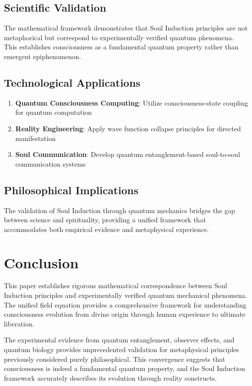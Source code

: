 \documentclass[12pt,a4paper]{article}
\begin{document}
\subsection{Scientific Validation}
The mathematical framework demonstrates that Soul Induction principles are not metaphorical but correspond to experimentally verified quantum phenomena. This establishes consciousness as a fundamental quantum property rather than emergent epiphenomenon.

\subsection{Technological Applications}
\begin{enumerate}
\item \textbf{Quantum Consciousness Computing}: Utilize consciousness-state coupling for quantum computation
\item \textbf{Reality Engineering}: Apply wave function collapse principles for directed manifestation
\item \textbf{Soul Communication}: Develop quantum entanglement-based soul-to-soul communication systems
\end{enumerate}

\subsection{Philosophical Implications}
The validation of Soul Induction through quantum mechanics bridges the gap between science and spirituality, providing a unified framework that accommodates both empirical evidence and metaphysical experience.

\section{Conclusion}
This paper establishes rigorous mathematical correspondence between Soul Induction principles and experimentally verified quantum mechanical phenomena. The unified field equation provides a comprehensive framework for understanding consciousness evolution from divine origin through human experience to ultimate liberation.

The experimental evidence from quantum entanglement, observer effects, and quantum biology provides unprecedented validation for metaphysical principles previously considered purely philosophical. This convergence suggests that consciousness is indeed a fundamental quantum property, and the Soul Induction framework accurately describes its evolution through reality constructs.
\end{document}
